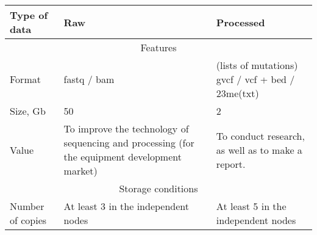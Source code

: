 \begin{tabular}{l|p{5cm}|p{5cm}}
   Type of data  &  Raw
                 &  Processed  \\ \hline
   \multicolumn{3}{c}{Features}
   \\ \hline
   Format        & fastq / bam
                 & (lists of mutations) gvcf / vcf + bed / 23me(txt) \\
   Size, Gb      & 50 & 2
   \\ \hline
   Value         & To improve the technology of sequencing and processing (for the equipment development market)
                 & To conduct research, as well as to make a report.
   \\ \hline
   \multicolumn{3}{c}{Storage conditions}
   \\ \hline
   Number of copies & At least 3 in the independent nodes
                    & At least 5 in the independent nodes
   \\ \hline
\end{tabular}
